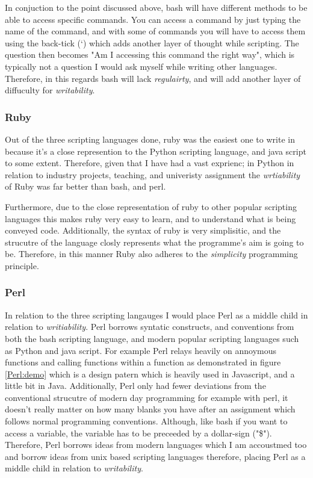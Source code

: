 \documentclass[
	12pt, %
]{fphw}
\begin{document}
In conjuction to the point discussed above, bash will have different methods to
be able to access specific commands. You can access a command by just typing
the name of the command, and with some of commands you will have to access them
using the back-tick (`) which adds another layer of thought  while scripting.
The question then becomes "Am I accessing this command the right way", which is
typically not a question I would ask myself while writing other languages.
Therefore, in this regards bash will lack \emph{regulairty}, and will add another
layer of diffuculty for \emph{writability}.


\subsubsection{Ruby} Out of the three scripting languages done, ruby was the
easiest one to write in because it's a close represention to the Python scripting
language, and java script to some extent. Therefore, given that I have had a
vast exprienc; in Python in relation to industry projects, teaching, and
univeristy assignment the \emph{wrtiability} of Ruby was far better than bash,
and perl.\par

Furthermore, due to the close representation of ruby to other popular scripting
languages this makes ruby very easy to learn, and to understand what is being
conveyed code. Additionally, the syntax of ruby is very simplisitic, and the
strucutre of the language closly represents what the programme's aim  is  going
to be. Therefore, in this manner Ruby also adheres to the \emph{simplicity}
programming principle.

\subsubsection{Perl} In relation to the three scripting langauges I would place
Perl as a middle child in relation to \emph{writiability}. Perl borrows syntatic
constructs, and conventions from both the bash scripting language, and modern
popular scripting languages such as Python and java script. For example Perl
relays heavily on annoymous functions and calling functions within a function
as demonstrated in figure \ref{Perl:demo} which is a design
patern which is heavily used in Javascript, and a little bit in Java. Additionally,
Perl only had fewer deviations from the conventional strucutre of modern day programming
for example with perl, it doesn't really matter on how many blanks you have after
an assignment which follows normal programming conventions. Although, like bash
if you want to access a variable, the variable has to be preceeded by a dollar-sign
("\$"). Therefore, Perl borrows ideas from modern languages which I am accoustmed too
and borrow ideas from unix based scripting languages therefore, placing Perl as
a middle child in relation to \emph{writability}.
\end{document}
